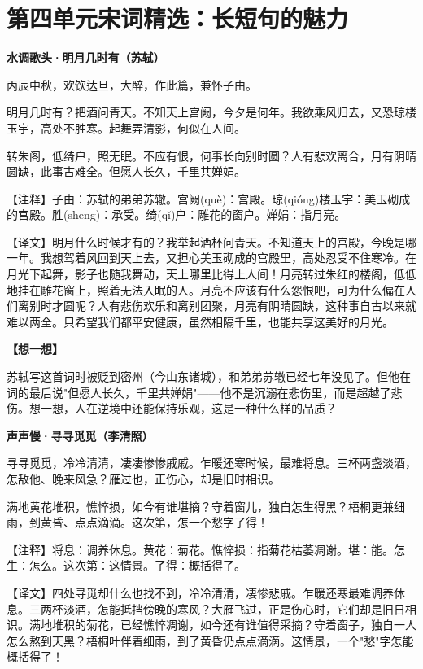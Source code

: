 \documentclass[a4paper,12pt]{ctexart}
\newcommand{\poemtitle}[1]{{\vspace{0.3cm}\noindent\textcolor{orange!80!black}{\large\bfseries #1}\par\vspace{0.1cm}}}
\newcommand{\annot}[1]{{\small\textcolor{blue!60!black}{#1}}}
\newcommand{\thinkq}{\vspace{0.2cm}\noindent\textcolor{orange!60!black}{\small\bfseries【想一想】}\par}
\begin{document}
\newpage

\section*{\textcolor{orange!80!black}{第四单元\quad 宋词精选：长短句的魅力}}

\poemtitle{水调歌头·明月几时有（苏轼）}

丙辰中秋，欢饮达旦，大醉，作此篇，兼怀子由。

明月几时有？把酒问青天。不知天上宫阙，今夕是何年。我欲乘风归去，又恐琼楼玉宇，高处不胜寒。起舞弄清影，何似在人间。

转朱阁，低绮户，照无眠。不应有恨，何事长向别时圆？人有悲欢离合，月有阴晴圆缺，此事古难全。但愿人长久，千里共婵娟。

\annot{【注释】子由：苏轼的弟弟苏辙。宫阙(què)：宫殿。琼(qióng)楼玉宇：美玉砌成的宫殿。胜(shēng)：承受。绮(qǐ)户：雕花的窗户。婵娟：指月亮。}

\annot{【译文】明月什么时候才有的？我举起酒杯问青天。不知道天上的宫殿，今晚是哪一年。我想驾着风回到天上去，又担心美玉砌成的宫殿里，高处忍受不住寒冷。在月光下起舞，影子也随我舞动，天上哪里比得上人间！月亮转过朱红的楼阁，低低地挂在雕花窗上，照着无法入眠的人。月亮不应该有什么怨恨吧，可为什么偏在人们离别时才圆呢？人有悲伤欢乐和离别团聚，月亮有阴晴圆缺，这种事自古以来就难以两全。只希望我们都平安健康，虽然相隔千里，也能共享这美好的月光。}

\thinkq 苏轼写这首词时被贬到密州（今山东诸城），和弟弟苏辙已经七年没见了。但他在词的最后说"但愿人长久，千里共婵娟"——他不是沉溺在悲伤里，而是超越了悲伤。想一想，人在逆境中还能保持乐观，这是一种什么样的品质？

\poemtitle{声声慢·寻寻觅觅（李清照）}

寻寻觅觅，冷冷清清，凄凄惨惨戚戚。乍暖还寒时候，最难将息。三杯两盏淡酒，怎敌他、晚来风急？雁过也，正伤心，却是旧时相识。

满地黄花堆积，憔悴损，如今有谁堪摘？守着窗儿，独自怎生得黑？梧桐更兼细雨，到黄昏、点点滴滴。这次第，怎一个愁字了得！

\annot{【注释】将息：调养休息。黄花：菊花。憔悴损：指菊花枯萎凋谢。堪：能。怎生：怎么。这次第：这情景。了得：概括得了。}

\annot{【译文】四处寻觅却什么也找不到，冷冷清清，凄惨悲戚。乍暖还寒最难调养休息。三两杯淡酒，怎能抵挡傍晚的寒风？大雁飞过，正是伤心时，它们却是旧日相识。满地堆积的菊花，已经憔悴凋谢，如今还有谁值得采摘？守着窗子，独自一人怎么熬到天黑？梧桐叶伴着细雨，到了黄昏仍点点滴滴。这情景，一个"愁"字怎能概括得了！}
\end{document}
